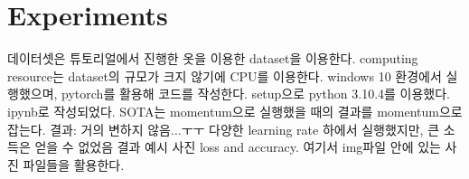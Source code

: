 \documentclass{article}
\begin{document}
\section{Experiments}
데이터셋은 튜토리얼에서 진행한 옷을 이용한 dataset을 이용한다.
computing resource는 dataset의 규모가 크지 않기에 CPU를 이용한다. windows 10 환경에서 실행했으며, pytorch를 활용해 코드를 작성한다.
setup으로 python 3.10.4를 이용했다. ipynb로 작성되었다.
SOTA는 momentum으로 실행했을 때의 결과를 momentum으로 잡는다.
결과: 거의 변하지 않음...ㅜㅜ
다양한 learning rate 하에서 실행했지만, 큰 소득은 얻을 수 없었음
결과 예시 사진 loss and accuracy. 여기서 img파일 안에 있는 사진 파일들을 활용한다.
\end{document}
